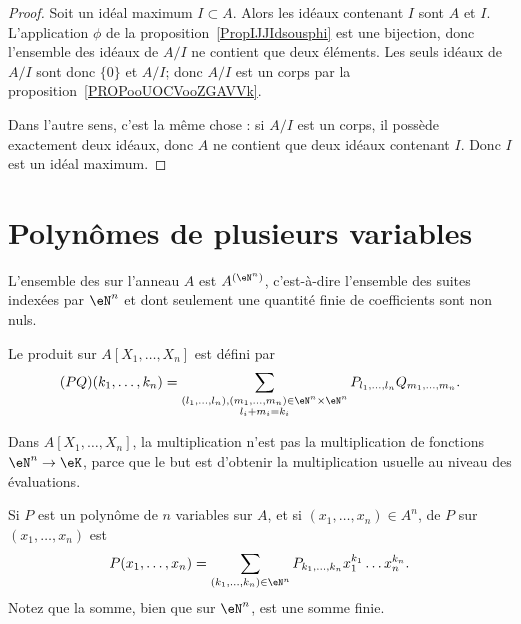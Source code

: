 \begin{proof}
	Soit un idéal maximum \( I\subset A\). Alors les idéaux contenant \( I\) sont \( A\) et \( I\). L'application \( \phi\) de la proposition~\ref{PropIJJIdsousphi} est une bijection, donc l'ensemble des idéaux de \( A/I\) ne contient que deux éléments. Les seuls idéaux de \( A/I\) sont donc \( \{ 0 \}\) et \( A/I\); donc \( A/I\) est un corps par la proposition~\ref{PROPooUOCVooZGAVVk}.

	Dans l'autre sens, c'est la même chose : si \( A/I\) est un corps, il possède exactement deux idéaux, donc \( A\) ne contient que deux idéaux contenant \( I\). Donc \( I\) est un idéal maximum.
\end{proof}

\section{Polynômes de plusieurs variables}

\begin{definition}      \label{DEFooZNHOooCruuwI}
	L'ensemble des  sur l'anneau \( A\) est \( A^{(\eN^n)}\), c'est-à-dire l'ensemble des suites indexées par \( \eN^n\) et dont seulement une quantité finie de coefficients sont non nuls.

	Le produit sur \( A[X_1,\ldots, X_n]\) est défini par
	\begin{equation}
		(PQ)(k_1,\ldots, k_n)=\sum_{\substack{ (l_1,\ldots, l_n),(m_1,\ldots, m_n)\in \eN^n\times \eN^n   \\l_i+m_i=k_i}}P_{l_1,\ldots, l_n}Q_{m_1,\ldots, m_n}.
	\end{equation}
\end{definition}

\begin{normaltext}
	Dans \( A[X_1,\ldots, X_n]\), la multiplication n'est pas la multiplication de fonctions \( \eN^n\to \eK\), parce que le but est d'obtenir la multiplication usuelle au niveau des évaluations.
\end{normaltext}

\begin{definition}
	Si \( P\) est un polynôme de \( n\) variables sur \( A\), et si \( (x_1,\ldots, x_n)\in A^n\),  de \( P\) sur \( (x_1,\ldots, x_n)\) est
	\begin{equation}
		P(x_1,\ldots, x_n)=\sum_{(k_1,\ldots, k_n)\in \eN^n}P_{k_1,\ldots, k_n}x_1^{k_1}\ldots x_n^{k_n}.
	\end{equation}
	Notez que la somme, bien que sur \( \eN^n\), est une somme finie.
\end{definition}

